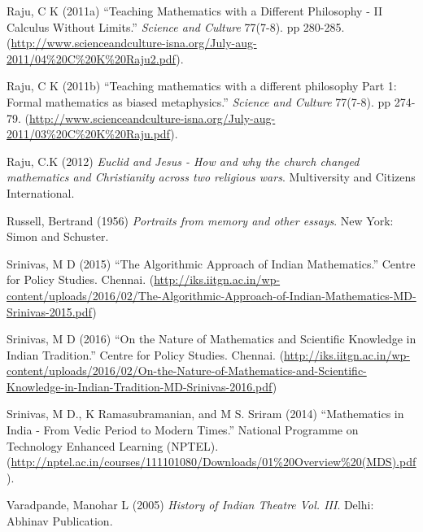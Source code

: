 \begin{thebibliography}{99}
Raju, C K (2011a) ``Teaching Mathematics with a Different Philosophy - II Calculus Without Limits.'' {\sl Science and Culture} 77(7-8). pp 280-285. (\url{http://www.scienceandculture-isna.org/July-aug-2011/04%20C%20K%20Raju2.pdf}).

Raju, C K (2011b) ``Teaching mathematics with a different philosophy Part 1: Formal mathematics as biased metaphysics.'' {\sl Science and Culture} 77(7-8). pp 274-79. (\url{http://www.scienceandculture-isna.org/July-aug-2011/03%20C%20K%20Raju.pdf}).

Raju, C.K (2012) {\sl Euclid and Jesus - How and why the church changed mathematics and Christianity across two religious wars}. Multiversity and Citizens International.

Russell, Bertrand (1956) {\sl Portraits from memory and other essays}. New York: Simon and Schuster.

Srinivas, M D (2015) ``The Algorithmic Approach of Indian Mathematics.'' Centre for Policy Studies. Chennai. (\url{http://iks.iitgn.ac.in/wp-content/uploads/2016/02/The-Algorithmic-Approach-of-Indian-Mathematics-MD-Srinivas-2015.pdf})

Srinivas, M D (2016) ``On the Nature of Mathematics and Scientific Knowledge in Indian Tradition.'' Centre for Policy Studies. Chennai. (\url{http://iks.iitgn.ac.in/wp-content/uploads/2016/02/On-the-Nature-of-Mathematics-and-Scientific-Knowledge-in-Indian-Tradition-MD-Srinivas-2016.pdf})

Srinivas, M D., K Ramasubramanian, and M S. Sriram (2014) ``Mathematics in India - From Vedic Period to Modern Times.'' National Programme on Technology Enhanced Learning (NPTEL). (\url{http://nptel.ac.in/courses/111101080/Downloads/01%20Overview%20(MDS).pdf}).

Varadpande, Manohar L (2005) {\sl History of Indian Theatre Vol. III}. Delhi: Abhinav Publication.
\end{thebibliography}

\theendnotes
